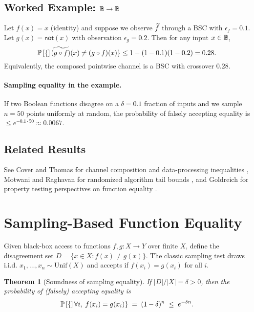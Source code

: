 \documentclass[11pt,final,hidelinks]{article}
\newtheorem{theorem}{Theorem}[section]
\begin{document}
\subsection{Worked Example: $\mathbb{B}\to\mathbb{B}$}

Let $f(x)=x$ (identity) and suppose we observe $\widetilde{f}$ through a BSC with $\epsilon_f=0.1$. Let $g(x)=\mathsf{not}(x)$ with observation $\epsilon_g=0.2$. Then for any input $x\in\mathbb{B}$,
\begin{equation}
    \mathbb{P}\left[\{\right]\widetilde{(g\circ f)}(x)\neq (g\circ f)(x)\} \le 1-(1-0.1)(1-0.2)=0.28.
\end{equation}
Equivalently, the composed pointwise channel is a BSC with crossover $0.28$.

\paragraph{Sampling equality in the example.} If two Boolean functions disagree on a $\delta=0.1$ fraction of inputs and we sample $n=50$ points uniformly at random, the probability of falsely accepting equality is $\le e^{-0.1\cdot 50} \approx 0.0067$.

\subsection{Related Results}
See Cover and Thomas for channel composition and data-processing inequalities \cite{cover2006}, Motwani and Raghavan for randomized algorithm tail bounds \cite{motwani1995}, and Goldreich for property testing perspectives on function equality \cite{goldreich2017}.

\section{Sampling-Based Function Equality}

Given black-box access to functions $f,g:X\to Y$ over finite $X$, define the disagreement set $D=\{x\in X: f(x)\neq g(x)\}$. The classic sampling test draws i.i.d. $x_1,\dots,x_n\sim\mathrm{Unif}(X)$ and accepts if $f(x_i)=g(x_i)$ for all $i$.

\begin{theorem}[Soundness of sampling equality]
If $|D|/|X|=\delta>0$, then the probability of (falsely) accepting equality is
\begin{equation}
\mathbb{P}\left[\{\right] \forall i,\; f(x_i)=g(x_i) \} \;=\; (1-\delta)^n \;\le\; e^{-\delta n}.
\end{equation}
\end{theorem}
\end{document}
